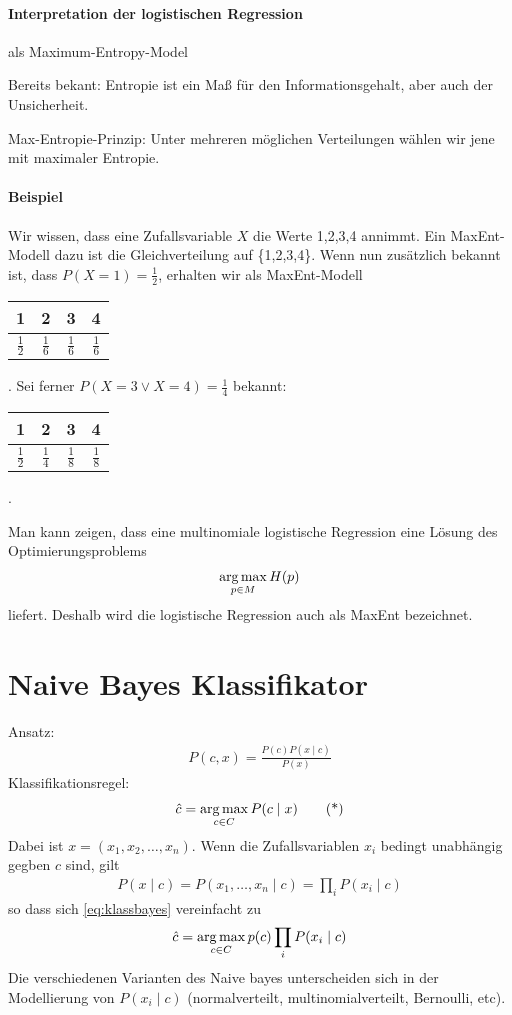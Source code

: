 \paragraph{Interpretation der logistischen Regression} als Maximum-Entropy-Model
\label{par:interpretation_der_logistischen_regression}

Bereits bekant: Entropie ist ein Maß für den Informationsgehalt, aber auch der
Unsicherheit.

Max-Entropie-Prinzip: Unter mehreren möglichen Verteilungen wählen wir jene mit
maximaler Entropie.

\begin{shaded}
\paragraph{Beispiel}
\label{par:beispielme}
Wir wissen, dass eine Zufallsvariable $X$ die Werte 1,2,3,4 annimmt. Ein
MaxEnt-Modell dazu ist die Gleichverteilung auf \{1,2,3,4\}. Wenn nun
zusätzlich bekannt ist, dass $P(X=1)=\frac{1}{2}$, erhalten wir als
MaxEnt-Modell \begin{tabular}[t]{cccc}
    1 & 2 & 3 & 4 \\\hline
    $\frac{1}{2}$ & $\frac{1}{6}$ & $\frac{1}{6}$ & $\frac{1}{6}$
\end{tabular}.
Sei ferner $P(X=3 \lor X=4)=\frac{1}{4}$ bekannt:
\begin{tabular}[t]{cccc}
    1 & 2 & 3 & 4 \\\hline
    $\frac{1}{2}$ & $\frac{1}{4}$ & $\frac{1}{8}$ & $\frac{1}{8}$
\end{tabular}.
\end{shaded}

Man kann zeigen, dass eine multinomiale logistische Regression eine Lösung des
Optimierungsproblems
\begin{align*}
\operatorname*{arg\,max}_{p\in M} H(p)
\end{align*}
liefert. Deshalb wird die logistische
Regression auch als MaxEnt bezeichnet.

\section{Naive Bayes Klassifikator}
\label{sec:naive_bayes_klassifikator}

Ansatz:
\begin{align*}
    P(c,x)=\frac{P(c)P(x\mid c)}{P(x)}
\end{align*}
Klassifikationsregel:
\begin{align*}
    \hat c=\operatorname*{arg\,max}\limits_{c\in C} P(c\mid x) \tag{*}\label{eq:klassbayes}
\end{align*}
Dabei ist $x=(x_1,x_2,\dots,x_n)$. Wenn die Zufallsvariablen $x_i$ bedingt
unabhängig gegben $c$ sind, gilt
\begin{align*}
    P(x\mid c)=P(x_1,\dots,x_n\mid c)=\prod_i P(x_i\mid c)
\end{align*}
so dass sich \cref{eq:klassbayes} vereinfacht zu
\begin{align*}
    \hat c= \operatorname*{arg\,max}_{c\in C}p(c)\prod_i P(x_i\mid c)
\end{align*}
Die verschiedenen Varianten des Naive bayes unterscheiden sich in der
Modellierung von $P(x_i\mid c)$ (normalverteilt, multinomialverteilt,
Bernoulli, etc).
